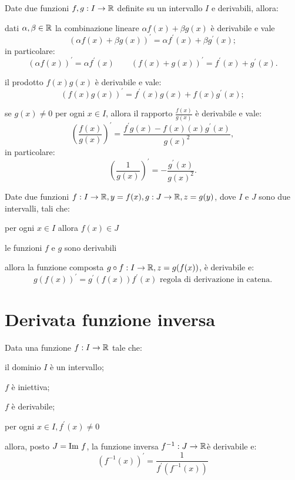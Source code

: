 \begin{teo}
Date due funzioni $f,g:I\rightarrow\mathbb{R}$ definite su un intervallo $I$ e derivabili, allora:
\begin{aenumerate}
\item dati $\alpha,\beta \in\mathbb{R}$ la combinazione lineare $\alpha f(x)+\beta g(x)$ è derivabile e vale
\[(\alpha f(x)+\beta g(x))^\prime = \alpha f^\prime(x) + \beta g^\prime(x);\]
in particolare:
\[ (\alpha f(x))^\prime = \alpha f^\prime(x) \qquad (f(x)+g(x))^\prime=f^\prime(x)+g^\prime(x).\]
\item il prodotto $f(x)g(x)$ è derivabile e vale:
\[(f(x)g(x))^\prime = f^\prime(x)g(x)+f(x)g^\prime(x);\]
\item se $g(x)\neq 0$ per ogni $x\in I$, allora il rapporto $\frac{f(x)}{g(x)}$	è derivabile e vale:
\[\left(\frac{f(x)}{g(x)}\right)^\prime = \frac{f^\prime g(x)-f(x)(x)g^\prime(x)}{g(x)^2},\]
in particolare:
\[\left( \frac{1}{g(x)} \right)^\prime = - \frac{g^\prime(x)}{g(x)^2}.\]
\end{aenumerate}
\end{teo}

\begin{teo}
Date due funzioni $f:I\rightarrow\mathbb{R}, y=f(x), g:J\rightarrow\mathbb{R}, z=g(y)$, dove $I$ e $J$ sono due intervalli, tali che:
\begin{aenumerate}
\item per ogni $x\in I$ allora $f(x)\in J$
\item le funzioni $f$ e $g$ sono derivabili
\end{aenumerate}
allora la funzione composta $g \circ f: I\rightarrow \mathbb{R}, z=g(f(x))$, è derivabile e:
\[g(f(x))^\prime=g^\prime(f(x))f^\prime(x) \text{     regola di derivazione in catena.}\]
\end{teo}

\section{Derivata funzione inversa}
Data una funzione $f:I \rightarrow \mathbb{R}$ tale che:
\begin{aenumerate}
\item il dominio $I$ è un intervallo;
\item $f$ è iniettiva;
\item $f$ è derivabile;
\item per ogni $x\in I, f^\prime(x) \neq 0 $
\end{aenumerate}
allora, posto $J=\text{Im } f$, la funzione inversa $f^{-1}:J\rightarrow\mathbb{R}$è derivabile e:
\[(f^{-1}(x))^\prime = \frac{1}{f^\prime(f^{-1}(x))}\]

